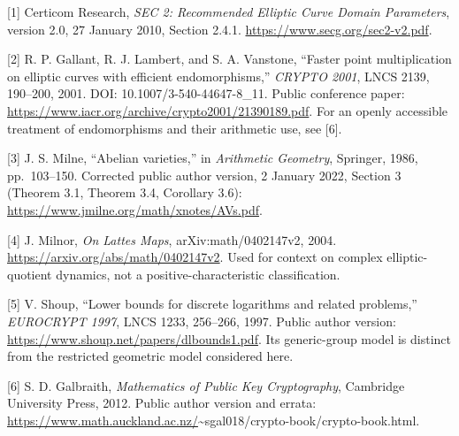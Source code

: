 \documentclass[
  11pt,
  a4paper,
]{article}
\begin{document}
{[}1{]} Certicom Research, \emph{SEC 2: Recommended Elliptic Curve
Domain Parameters}, version 2.0, 27 January 2010, Section 2.4.1.
\url{https://www.secg.org/sec2-v2.pdf}.

{[}2{]} R. P. Gallant, R. J. Lambert, and S. A. Vanstone, ``Faster point
multiplication on elliptic curves with efficient endomorphisms,''
\emph{CRYPTO 2001}, LNCS 2139, 190--200, 2001. DOI:
10.1007/3-540-44647-8\_11. Public conference paper:
\url{https://www.iacr.org/archive/crypto2001/21390189.pdf}. For an
openly accessible treatment of endomorphisms and their arithmetic use,
see {[}6{]}.

{[}3{]} J. S. Milne, ``Abelian varieties,'' in \emph{Arithmetic
Geometry}, Springer, 1986, pp.~103--150. Corrected public author
version, 2 January 2022, Section 3 (Theorem 3.1, Theorem 3.4, Corollary
3.6): \url{https://www.jmilne.org/math/xnotes/AVs.pdf}.

{[}4{]} J. Milnor, \emph{On Lattes Maps}, arXiv:math/0402147v2, 2004.
\url{https://arxiv.org/abs/math/0402147v2}. Used for context on complex
elliptic-quotient dynamics, not a positive-characteristic
classification.

{[}5{]} V. Shoup, ``Lower bounds for discrete logarithms and related
problems,'' \emph{EUROCRYPT 1997}, LNCS 1233, 256--266, 1997. Public
author version: \url{https://www.shoup.net/papers/dlbounds1.pdf}. Its
generic-group model is distinct from the restricted geometric model
considered here.

{[}6{]} S. D. Galbraith, \emph{Mathematics of Public Key Cryptography},
Cambridge University Press, 2012. Public author version and errata:
\url{https://www.math.auckland.ac.nz/}\textasciitilde sgal018/crypto-book/crypto-book.html.
\end{document}
